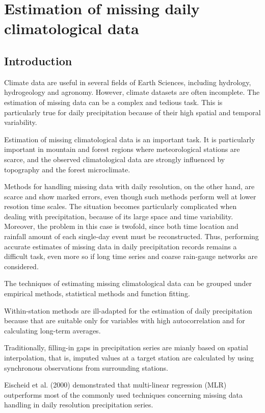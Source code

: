 \documentclass[WHATMANUAL.tex]{subfiles}
\begin{document}
\chapter{Estimation of missing daily climatological data}\label{chap:Missing_weather_theory}

\section{Introduction}



Climate data are useful in several fields of Earth Sciences, including hydrology, hydrogeology and agronomy. However, climate datasets are often incomplete. The estimation of missing data can be a complex and tedious task. This is particularly true for daily precipitation because of their high spatial and temporal variability. 

Estimation of missing climatological data is an important task. It is particularly important in mountain and forest regions where meteorological stations are scarce, and the observed climatological data are strongly influenced by topography and the forest microclimate.

Methods for handling missing data with daily resolution, on the other hand, are scarce and show marked errors, even though such methods perform well at lower resotion time scales. The situation becomes particularly complicated when dealing with precipitation, because of its large space and time variability. Moreover, the problem in this case is twofold, since both time location and rainfall amount of each single-day event must be reconstructed. Thus, performing accurate estimates of missing data in daily precipitation records remains a difficult task, even more so if long time series and coarse rain-gauge networks are considered.

The techniques of estimating missing climatological data can be grouped under empirical methods, statistical methods and function fitting.

Within-station methods are ill-adapted for the estimation of daily precipitation because that are suitable only for variables with high autocorrelation and for calculating long-term averages.

Traditionally, filling-in gaps in precipitation series are mianly based on spatial interpolation, that is, imputed values at a target station are calculated by using synchronous observations from surrounding stations. 

Eischeid et al. (2000) demonstrated that multi-linear regression (MLR) outperforms most of the commonly used techniques concerning missing data handling in daily resolution precipitation series.
\end{document}
